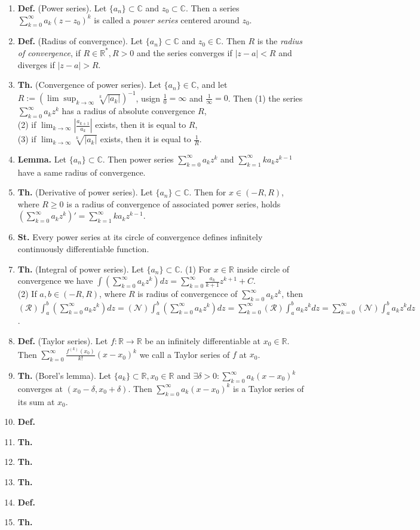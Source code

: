 \documentclass{article}
\newcommand{\<}{\left<}
\renewcommand{\>}{\right>}
\newcommand{\R}{\mathbb{R}}
\newcommand{\C}{\mathbb{C}}
\newcommand{\define}{\textbf{Def. }}
\newcommand{\lemma}{\textbf{Lemma. }}
\newcommand{\state}{\textbf{St. }}
\newcommand{\theor}{\textbf{Th. }}
\begin{document}
\begin{multicols}{3}
\begin{enumerate}[itemsep=2pt, topsep=2pt, partopsep=2pt, parsep=2pt]
        \item \define (Power series). Let $\{a_n\}\subset\C$ and $z_0\subset\C$. Then a series $\sum_{k=0}^\infty a_k(z-z_0)^k$ is called a \emph{power series} centered around $z_0$.
        \item \define (Radius of convergence). Let $\{a_n\}\subset\C$ and $z_0\in\C$. Then $R$ is the \emph{radius of convergence}, if $R\in\R^*,R>0$ and the series converges if $|z-a|<R$ and diverges if $|z-a|>R$.
        \item \theor (Convergence of power series). Let $\{a_n\}\in\C$, and let $R:=(\lim\sup_{k\to\infty}\sqrt[k]{|a_k|})^{-1}$, usign $\frac{1}{0}=\infty$ and $\frac{1}{\infty}=0$. Then
        (1) the series $\sum_{k=0}^\infty a_kz^k$ has a radius of absolute convergence $R$,\\
        (2) if $\lim_{k\to\infty}|\frac{a_{k+1}}{a_k}|$ exists, then it is equal to $R$,\\
        (3) if $\lim_{k\to\infty}\sqrt[k]{|a_k|}$ exists, then it is equal to $\frac{1}{R}$.
        \item \lemma Let $\{a_n\}\subset\C$. Then power series $\sum_{k=0}^\infty a_kz^k$ and $\sum_{k=1}^\infty ka_kz^{k-1}$ have a same radius of convergence.
        \item \theor (Derivative of power series). Let $\{a_n\}\subset\C$. Then for $x\in(-R,R)$, where $R\geq 0$ is a radius of convergence of associated power series, holds $(\sum_{k=0}^\infty a_kz^k)'=\sum_{k=1}^\infty ka_kz^{k-1}$.
        \item \state Every power series at its circle of convergence defines infinitely continuously differentiable function.
        \item \theor (Integral of power series). Let $\{a_n\}\subset\C$. (1) For $x\in\R$ inside circle of convergence we have $\int(\sum_{k=0}^\infty a_kz^k)dz=\sum_{k=0}^\infty \frac{a_k}{k+1}z^{k+1}+C$.\\
        (2) If $a,b\in(-R,R)$, where $R$ is radius of convergencce of $\sum_{k=0}^\infty a_kz^k$, then\\
        $(\mathcal R)\int_a^b(\sum_{k=0}^\infty a_kz^k)dz=(\mathcal N)\int_a^b(\sum_{k=0}^\infty a_kz^k)dz=\sum_{k=0}^\infty (\mathcal R)\int_a^ba_kz^kdz=\sum_{k=0}^\infty (\mathcal N)\int_a^ba_kz^kdz$.
        \item \define (Taylor series). Let $f:\R\to\R$ be an infinitely differentiable at $x_0\in\R$. Then $\sum_{k=0}^\infty\frac{f^{(k)}(x_0)}{k!}(x-x_0)^k$ we call a Taylor series of $f$ at $x_0$.
        \item \theor (Borel's lemma). Let $\{a_k\}\subset\R,x_0\in\R$ and $\exists\delta>0:\sum_{k=0}^\infty a_k(x-x_0)^k$ converges at $(x_0-\delta,x_0+\delta)$. Then $\sum_{k=0}^\infty a_k(x-x_0)^k$ is a Taylor series of its sum at $x_0$.
        \item \define
        \item \theor
        \item \theor
        \item \theor
        \item \define
        \item \theor


\end{enumerate}
\end{multicols}
\end{document}
